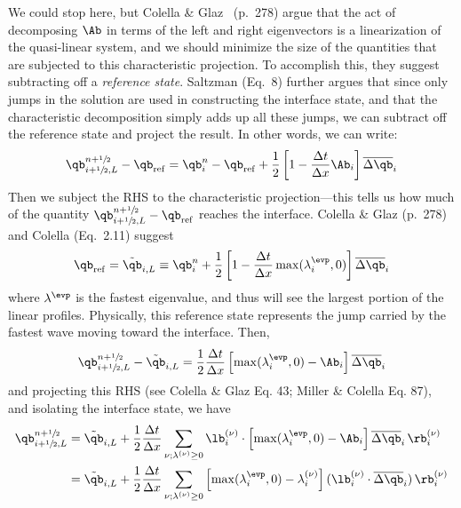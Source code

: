 We could stop here, but Colella \& Glaz~\cite{colellaglaz:1985}
(p.\ 278) argue that the act of decomposing $\Ab$ in terms of the left
and right eigenvectors is a linearization of the quasi-linear system,
and we should minimize the size of the quantities that are subjected
to this characteristic projection.  To accomplish this, they suggest
subtracting off a {\em reference state}.  Saltzman (Eq.\ 8) further
argues that since only jumps in the solution are used in constructing
the interface state, and that the characteristic decomposition simply adds
up all these jumps, we can subtract off the reference state and
project the result.  In other words, we can write:
\begin{equation}
\qb_{i+\myhalf,L}^{n+\myhalf} - \qb_\mathrm{ref} = \qb_i^n - \qb_\mathrm{ref} +
  \frac{1}{2} \left [ 1 - \frac{\Delta t}{\Delta x} \Ab_i \right ] \overline{\Delta \qb}_i
\label{eq:lin_decomp}
\end{equation}
Then we subject the RHS to the characteristic projection---this tells
us how much of the quantity $\qb_{i+\myhalf,L}^{n+\myhalf} - \qb_\mathrm{ref}$
reaches the interface.  Colella \& Glaz (p.\ 278) and Colella
(Eq.\ 2.11) suggest
\begin{equation}
\qb_\mathrm{ref} = \tilde{\qb}_{i,L} \equiv \qb_i^n +
   \frac{1}{2} \left [ 1 - \frac{\Delta t}{\Delta x}
 \max(\lambda_i^\evp, 0) \right ] \overline{\Delta \qb}_i \label{eq:qref}
\end{equation}
where $\lambda^\evp$ is the fastest eigenvalue, and thus will see
the largest portion of the linear profiles.  Physically, this
reference state represents the jump carried by the fastest wave
moving toward the interface.  Then,
\begin{equation}
\qb_{i+\myhalf,L}^{n+\myhalf} - \tilde{\qb}_{i,L} = \frac{1}{2} \frac{\Delta t}{\Delta x}
  \left [ \max(\lambda_i^\evp,0) - \Ab_i \right ] \overline{\Delta \qb}_i
\end{equation}
and projecting this RHS (see Colella \& Glaz Eq. 43; Miller \& Colella Eq. 87),
and isolating the interface state, we have
\begin{align}
\qb_{i+\myhalf,L}^{n+\myhalf} &= \tilde{\qb}_{i,L} + \frac{1}{2} \frac{\Delta t}{\Delta x}
       \sum_{\nu; \lambda^{(\nu)} \ge 0} \lb_i^{(\nu)} \cdot \left [ \max(\lambda_i^\evp,0) - \Ab_i \right ]
                                           \overline{\Delta \qb}_i \, \rb_i^{(\nu)} \\
                    &= \tilde{\qb}_{i,L} + \frac{1}{2} \frac{\Delta t}{\Delta x}
       \sum_{\nu; \lambda^{(\nu)} \ge 0} \left [ \max(\lambda_i^\evp,0) - \lambda_i^{(\nu)} \right ]
                                          (\lb_i^{(\nu)} \cdot \overline{\Delta \qb}_i) \, \rb_i^{(\nu)}
\end{align}
